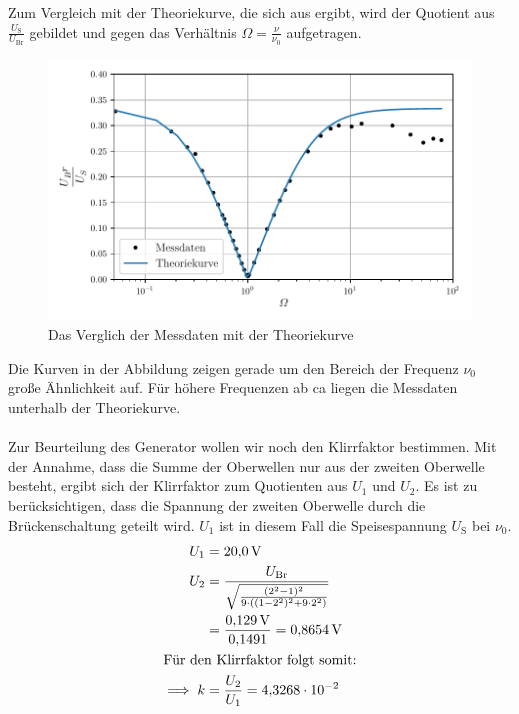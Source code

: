 Zum Vergleich mit der Theoriekurve, die sich aus  %
ergibt, wird der Quotient aus $\frac{U_{\text{S}}}{U_{\text{Br}}}$ gebildet und gegen das Verhältnis $\Omega = \frac{\nu}{\nu_0}$ aufgetragen.\\
\begin{figure}
  \centering
  \label{fig:auswplot}
  \caption{Das Verglich der Messdaten mit der Theoriekurve}
  \includegraphics[width = \textwidth]{plot.pdf}
\end{figure}
Die Kurven in der Abbildung zeigen gerade um den Bereich der Frequenz $\nu_0$ große Ähnlichkeit auf.
Für höhere Frequenzen ab ca liegen die Messdaten unterhalb der Theoriekurve.\\
\\
Zur Beurteilung des Generator wollen wir noch den Klirrfaktor bestimmen.
Mit der Annahme, dass die Summe der Oberwellen nur aus der zweiten Oberwelle besteht, ergibt sich der Klirrfaktor zum Quotienten aus $U_1$ und $U_2$.
Es ist zu berücksichtigen, dass die Spannung der zweiten Oberwelle durch die Brückenschaltung geteilt wird.
$U_1$ ist in diesem Fall die Speisespannung $U_{\text{S}}$ bei $\nu_0$.
\begin{align*}
  U_1 &= \SI{20.0}{\volt}\\
  U_2 &= \frac{U_{\text{Br}}}{\sqrt{\frac{(2^2 -1)^2}{9\cdot ((1-2^2)^2 + 9\cdot 2^2)}}}\\
&= \frac{\SI{0.129}{\volt}}{\num{0.1491}} = \SI{0.8654}{\volt}\\
\intertext{Für den Klirrfaktor folgt somit:}
\implies k &= \frac{U_2}{U_1} = \num{4.3268e-2}
\end{align*}